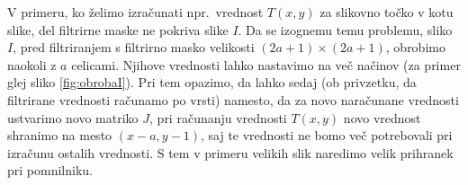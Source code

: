 V primeru, ko želimo izračunati npr.\ vrednost $T(x, y)$ za slikovno točko v kotu slike, del filtrirne maske ne pokriva slike $I$. Da se izognemu temu problemu, sliko $I$, pred filtriranjem s filtrirno masko velikosti $(2a + 1) \times (2a + 1)$, obrobimo naokoli z $a$ celicami. Njihove vrednosti lahko nastavimo na več načinov (za primer glej sliko \ref{fig:obrobaI}). Pri tem opazimo, da lahko sedaj (ob privzetku, da filtrirane vrednosti računamo po vrsti) namesto, da za novo naračunane vrednosti ustvarimo novo matriko $J$, pri računanju vrednosti $T(x, y)$ novo vrednost shranimo na mesto $(x-a, y-1)$, saj te vrednosti ne bomo več potrebovali pri izračunu ostalih vrednosti. S tem v primeru velikih slik naredimo velik prihranek pri pomnilniku.
%
\begin{primer}


\end{primer}
